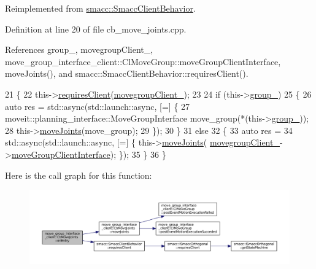 Reimplemented from \hyperlink{classsmacc_1_1SmaccClientBehavior_a7962382f93987c720ad432fef55b123f}{smacc\+::\+Smacc\+Client\+Behavior}.



Definition at line 20 of file cb\+\_\+move\+\_\+joints.\+cpp.



References group\+\_\+, movegroup\+Client\+\_\+, move\+\_\+group\+\_\+interface\+\_\+client\+::\+Cl\+Move\+Group\+::move\+Group\+Client\+Interface, move\+Joints(), and smacc\+::\+Smacc\+Client\+Behavior\+::requires\+Client().


\begin{DoxyCode}
21   \{
22     this->\hyperlink{classsmacc_1_1SmaccClientBehavior_a917f001e763a1059af337bf4e164f542}{requiresClient}(\hyperlink{classmove__group__interface__client_1_1CbMoveJoints_a9c1ffe89b25fc5693949241217d73e90}{movegroupClient\_});
23 
24     \textcolor{keywordflow}{if} (this->\hyperlink{classmove__group__interface__client_1_1CbMoveJoints_aed3fff5331aa947ec89c55945bae1afc}{group\_})
25     \{
26       \textcolor{keyword}{auto} res = std::async(std::launch::async, [=] \{
27         moveit::planning\_interface::MoveGroupInterface move\_group(*(this->\hyperlink{classmove__group__interface__client_1_1CbMoveJoints_aed3fff5331aa947ec89c55945bae1afc}{group\_}));
28         this->\hyperlink{classmove__group__interface__client_1_1CbMoveJoints_aa60670293a8fafcb6e091b85af722822}{moveJoints}(move\_group);
29       \});
30     \}
31     \textcolor{keywordflow}{else}
32     \{
33       \textcolor{keyword}{auto} res =
34           std::async(std::launch::async, [=] \{ this->\hyperlink{classmove__group__interface__client_1_1CbMoveJoints_aa60670293a8fafcb6e091b85af722822}{moveJoints}(
      \hyperlink{classmove__group__interface__client_1_1CbMoveJoints_a9c1ffe89b25fc5693949241217d73e90}{movegroupClient\_}->\hyperlink{classmove__group__interface__client_1_1ClMoveGroup_a5f0ea9b52695661b17605691168d1f31}{moveGroupClientInterface}); \});
35     \}
36   \}
\end{DoxyCode}
Here is the call graph for this function\+:
\nopagebreak
\begin{figure}[H]
\begin{center}
\leavevmode
\includegraphics[width=350pt]{classmove__group__interface__client_1_1CbMoveJoints_af1e51367bb28be09704ab3747afff1f1_cgraph}
\end{center}
\end{figure}
